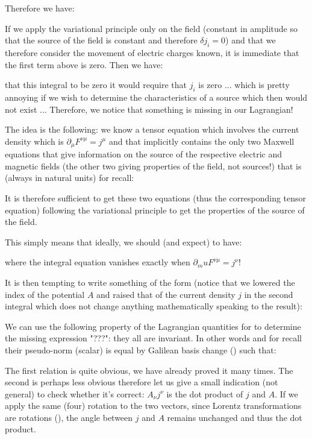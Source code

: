 	Therefore we have:
	
	If we apply the variational principle only on the field (constant in amplitude so that the source of the field is constant and therefore $\delta j_i=0$) and that we therefore consider the movement of electric charges known, it is immediate that the first term above is zero. Then we have:
	
	that this integral to be zero it would require that $j_i$ is zero ... which is pretty annoying if we wish to determine the characteristics of a source which then would not exist ... Therefore, we notice that something is missing in our Lagrangian!

	The idea is the following: we know a tensor equation which involves the current density which is $\partial_\mu F^{\nu\mu}=j^\mu$ and that implicitly contains the only two Maxwell equations that give information on the source of the respective electric and magnetic fields (the other two giving properties of the field, not sources!) that is (always in natural units) for recall:
	
	It is therefore sufficient to get these two equations (thus the corresponding tensor equation) following the variational principle to get the properties of the source of the field.
	
	This simply means that ideally, we should (and expect) to have:
	
	where the integral equation vanishes exactly when $\partial_mu F^{\nu\mu}=j^\nu$!

	It is then tempting to write something of the form (notice that we lowered the index of the potential $A$ and raised that of the current density $j$ in the second integral which does not change anything mathematically speaking to the result):
	
	We can use the following property of the Lagrangian quantities for to determine the missing expression "???": they all are invariant. In other words and for recall their pseudo-norm (scalar) is equal by Galilean basis change () such that:
	
	The first relation is quite obvious, we have already proved it many times. The second is perhaps less obvious therefore let us give a small indication (not general) to check whether it's correct: $A_\nu j^\nu$ is the dot product of $j$ and $A$. If we apply the same (four) rotation to the two vectors, since Lorentz transformations are rotations (), the angle between $j$ and $A$ remains unchanged and thus the dot product.

